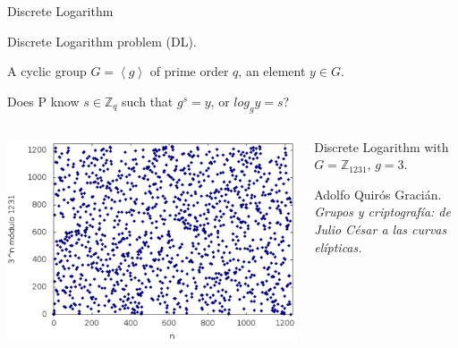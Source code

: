 \documentclass{beamer}
\begin{document}
\begin{frame}{Discrete Logarithm}

\begin{description}[Parameters]
	\item[Name] Discrete Logarithm problem (DL).
	\item[Parameters] A cyclic group $G=\left\langle g \right\rangle$ of prime order $q$, an element $y\in G$.
	\item[Question] Does P know  $s\in \mathbb{Z}_q$ such that $g^s = y$, or $log_g y = s$?
\end{description}

\begin{columns}
	
	\begin{column}{0.5\textwidth}
		\includegraphics[width=\linewidth]{DL}
	\end{column}
	\begin{column}{0.5\textwidth}
		Discrete Logarithm with $G=\mathbb{Z}_{1231}$, $g=3$.
		
		\small{Adolfo Quirós Gracián. \textit{Grupos y criptografía: de Julio César a las curvas elípticas.}}
	\end{column}
	
\end{columns}
\end{frame}
\end{document}
